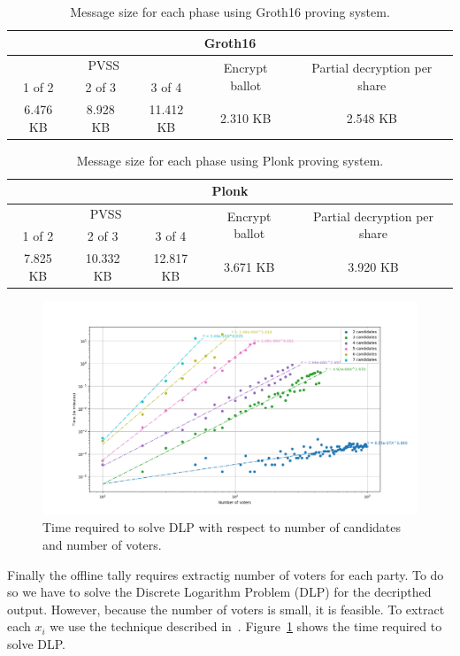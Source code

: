 \documentclass{article}
\begin{document}
\begin{table}
\centering
\label{table:groth16-size}
\caption{Message size for each phase using Groth16 proving system.}
\begin{tabular}{|c|c|c|c|c|}
    \hline
    \multicolumn{5}{|c|}{Groth16} \\
    \hline
    \multicolumn{3}{|c|}{PVSS} & \multirow{2}{*}{Encrypt ballot} & \multirow{2}{*}{Partial decryption per share} \\
    \cline{1-3}
    1 of 2 & 2 of 3 & 3 of 4 & & \\
    \hline
    6.476 KB& 8.928 KB & 11.412 KB & 2.310 KB & 2.548 KB\\
    \hline
\end{tabular}
\end{table}

\begin{table}
\centering
\label{table:plonk-size}
\caption{Message size for each phase using Plonk proving system.}
\begin{tabular}{|c|c|c|c|c|}
    \hline
    \multicolumn{5}{|c|}{Plonk} \\
    \hline
    \multicolumn{3}{|c|}{PVSS} & \multirow{2}{*}{Encrypt ballot} & \multirow{2}{*}{Partial decryption per share} \\
    \cline{1-3}
    1 of 2 & 2 of 3 & 3 of 4 & & \\
    \hline
    7.825 KB& 10.332 KB & 12.817 KB & 3.671 KB & 3.920 KB\\
    \hline
\end{tabular}
\end{table}

\begin{figure}
    \centering
    \includegraphics[width=\textwidth]{dlog-search-time.png}
    \caption{Time required to solve DLP with respect to number of candidates and number of voters.}
    \label{fig:dlog-search}
\end{figure}
Finally the offline tally requires extractig number of voters for each party. To do so we have to solve the Discrete Logarithm Problem (DLP) for the decripthed output. However, because the number of voters is small, it is feasible. To extract each $x_i$ we use the technique described in~\cite{haoAnonymousVotingTworound2010}. Figure~\ref{fig:dlog-search} shows the time required to solve DLP.
\end{document}
